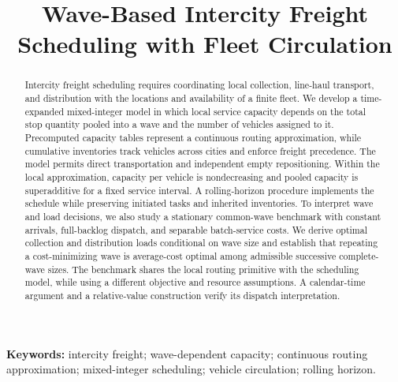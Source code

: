 \documentclass[11pt]{article}
\title{Wave-Based Intercity Freight Scheduling with Fleet Circulation}
\author{}
\date{}
\theoremstyle{remark}
\begin{document}
\maketitle

\begin{abstract}
Intercity freight scheduling requires coordinating local collection, line-haul transport, and distribution with the locations and availability of a finite fleet. We develop a time-expanded mixed-integer model in which local service capacity depends on the total stop quantity pooled into a wave and the number of vehicles assigned to it. Precomputed capacity tables represent a continuous routing approximation, while cumulative inventories track vehicles across cities and enforce freight precedence. The model permits direct transportation and independent empty repositioning. Within the local approximation, capacity per vehicle is nondecreasing and pooled capacity is superadditive for a fixed service interval. A rolling-horizon procedure implements the schedule while preserving initiated tasks and inherited inventories. To interpret wave and load decisions, we also study a stationary common-wave benchmark with constant arrivals, full-backlog dispatch, and separable batch-service costs. We derive optimal collection and distribution loads conditional on wave size and establish that repeating a cost-minimizing wave is average-cost optimal among admissible successive complete-wave sizes. The benchmark shares the local routing primitive with the scheduling model, while using a different objective and resource assumptions. A calendar-time argument and a relative-value construction verify its dispatch interpretation.
\end{abstract}

\noindent\textbf{Keywords:} intercity freight; wave-dependent capacity;
continuous routing approximation; mixed-integer scheduling;
vehicle circulation; rolling horizon.









\appendix






\end{document}
